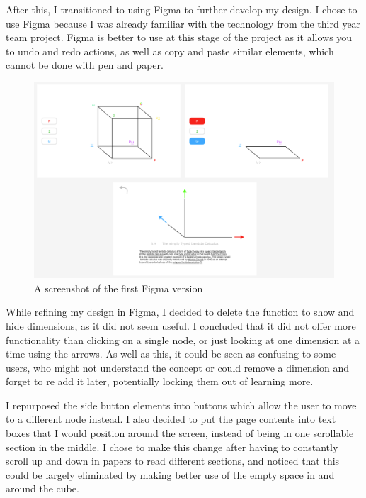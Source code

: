 \documentclass{l4proj}
\begin{document}
After this, I transitioned to using Figma to further develop my design.  I chose to use Figma because I was already familiar with the technology from the third year team project.  Figma is better to use at this stage of the project as it allows you to undo and redo actions, as well as copy and paste similar elements, which cannot be done with pen and paper.

\begin{figure}[h!]
    \centering
    \includegraphics[width=1\linewidth]{dissertation/images/v1_full_taller.png}
    \caption{A screenshot of the first Figma version}
    \label{fig:enter-label}
\end{figure}

While refining my design in Figma, I decided to delete the function to show and hide dimensions, as it did not seem useful.  I concluded that it did not offer more functionality than clicking on a single node, or just looking at one dimension at a time using the arrows.  As well as this, it could be seen as confusing to some users, who might not understand the concept or could remove a dimension and forget to re add it later, potentially locking them out of learning more.

I repurposed the side button elements into buttons which allow the user to move to a different node instead.  I also decided to put the page contents into text boxes that I would position around the screen, instead of being in one scrollable section in the middle.  I chose to make this change after having to constantly scroll up and down in papers to read different sections, and noticed that this could be largely eliminated by making better use of the empty space in and around the cube.
\end{document}
